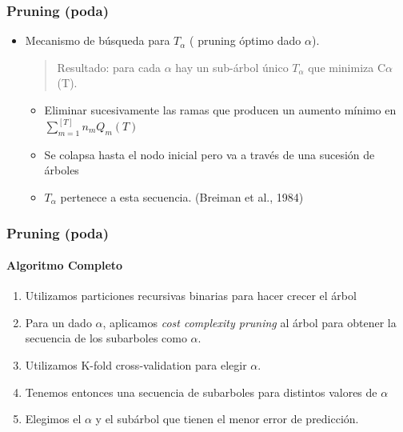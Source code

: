 \documentclass[
  shownotes,
  xcolor={svgnames},
  hyperref={colorlinks,citecolor=DarkBlue,linkcolor=andesred,urlcolor=DarkBlue}
  , aspectratio=169]{beamer}
\begin{document}
\begin{frame}[fragile]
\frametitle{Pruning (poda)}

\begin{itemize}
  \item Mecanismo de búsqueda para $T_\alpha$ ( pruning óptimo dado  $\alpha$).

\medskip
    \begin{quote}
    \centering
    Resultado: para cada  $\alpha$ hay un sub-árbol único  $T_\alpha$ que minimiza  C$\alpha$ (T).
    \end{quote}

\begin{itemize}

\medskip
\item Eliminar sucesivamente las ramas que producen un aumento mínimo en  $\sum_{m=1}^{[T]} n_m  Q_m (T)$
\medskip
\item Se colapsa hasta el nodo inicial pero va a través de una sucesión de árboles
\medskip
\item $T_\alpha$ pertenece a esta secuencia.  (Breiman et al., 1984)
\end{itemize}





\end{itemize}


\end{frame}
\begin{frame}[fragile]
\frametitle{Pruning (poda)}
\framesubtitle{Algoritmo Completo}


\begin{enumerate}
  \item Utilizamos particiones recursivas binarias para hacer crecer el árbol
  \medskip
  \item Para un dado $\alpha$, aplicamos {\it cost complexity pruning} al árbol para obtener la secuencia de los subarboles como  $\alpha$.
  \medskip
  \item  Utilizamos K-fold cross-validation para elegir $\alpha$. 
  \medskip
  
  
\item Tenemos entonces una secuencia de subarboles para distintos valores de $\alpha$ 
\medskip
\item Elegimos el $\alpha$ y el subárbol que tienen el menor error de predicción.
\end{enumerate}


\end{frame}
\end{document}
